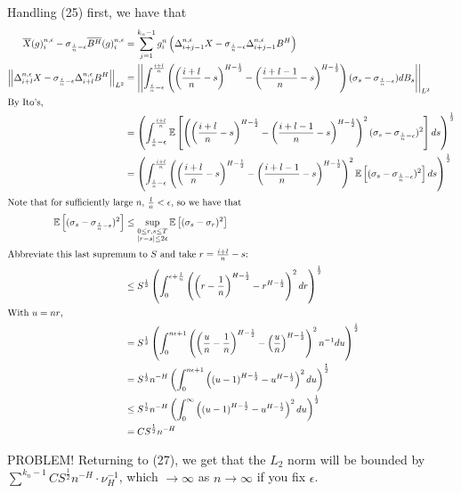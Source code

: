 \documentclass[12pt,letterpaper]{article}
\theoremstyle{definition}
\newcommand{\E}{\mathbb{E}}
\newcommand{\lpnorm}[2]{\left|\left|{#1}\right|\right|_{L^{#2}}}
\begin{document}
Handling (25) first, we have that
\begin{align}
  \overline{X}(g)^{n,\epsilon}_i - \sigma_{\frac{i}{n}-\epsilon}\overline{B^H}(g)^{n,\epsilon}_i &= \sum_{j=1}^{k_n-1}g^n_i\left( \Delta_{i+j-1}^{n,\epsilon}X - \sigma_{\frac{i}{n}-\epsilon}\Delta_{i+j-1}^{n,\epsilon}B^H\right) \\
    \lpnorm{\Delta_{i+l}^{n,\epsilon}X - \sigma_{\frac{i}{n}-\epsilon}\Delta_{i+l}^{n,\epsilon}B^H}{2} &= \lpnorm{\int_{\frac{i}{n} - \epsilon}^{\frac{i+l}{n}}\left( \left( \frac{i+l}{n} - s \right)^{H-\frac{1}{2}} - \left( \frac{i+l-1}{n} - s \right)^{H-\frac{1}{2}}\right) (\sigma_s - \sigma_{\frac{i}{n} - \epsilon})dB_s}{2} \\
    \intertext{By Ito's,}
                                                                              &= \left(\int_{\frac{i}{n} - \epsilon}^{\frac{i+l}{n}}\E\left[\left( \left( \frac{i+l}{n} - s \right)^{H-\frac{1}{2}} - \left( \frac{i+l-1}{n} - s \right)^{H-\frac{1}{2}}\right)^2 (\sigma_s - \sigma_{\frac{i}{n} - \epsilon})^2\right]ds\right)^{\frac{1}{2}} \\
                                                                              &= \left(\int_{\frac{i}{n} - \epsilon}^{\frac{i+l}{n}}\left( \left( \frac{i+l}{n} - s \right)^{H-\frac{1}{2}} - \left( \frac{i+l-1}{n} - s \right)^{H-\frac{1}{2}}\right)^2 \E\left[(\sigma_s - \sigma_{\frac{i}{n} - \epsilon})^2\right]ds\right)^{\frac{1}{2}} \\
                                                                              \intertext{Note that for sufficiently large \(n\), \(\frac{l}{n} < \epsilon\), so we have that}
    \E\left[(\sigma_s - \sigma_{\frac{i}{n} - \epsilon})^2\right] &\leq \sup_{\substack{0 \leq r,s \leq T \\ |r-s| \leq 2\epsilon}}\E\left[(\sigma_s - \sigma_r)^2\right] \\
    \intertext{Abbreviate this last supremum to \(S\) and take \(r = \frac{i+l}{n}-s\):}
                                                                  &\leq S^{\frac{1}{2}}\left(\int^{\epsilon+\frac{l}{n}}_0\left(\left(r - \frac{1}{n}\right)^{H-\frac{1}{2}} -  r^{H-\frac{1}{2}}\right)^2 dr\right)^{\frac{1}{2}} \\
                                                                  \intertext{With \(u = nr\),}
                                                                  &= S^{\frac{1}{2}}\left(\int^{n\epsilon+1}_0\left(\left(\frac{u}{n} - \frac{1}{n}\right)^{H-\frac{1}{2}} -  \left( \frac{u}{n} \right)^{H-\frac{1}{2}}\right)^2 n^{-1}du\right)^{\frac{1}{2}} \\
                                                                  &= S^{\frac{1}{2}}n^{-H}\left(\int^{n\epsilon+1}_0\left(\left(u - 1\right)^{H-\frac{1}{2}} -  u^{H-\frac{1}{2}}\right)^2 du\right)^{\frac{1}{2}} \\
                                                                  &\leq S^{\frac{1}{2}}n^{-H}\left(\int^{\infty}_0\left(\left(u - 1\right)^{H-\frac{1}{2}} -  u^{H-\frac{1}{2}}\right)^2 du\right)^{\frac{1}{2}} \\
                                                                  &= CS^{\frac{1}{2}}n^{-H}
\end{align}

PROBLEM! Returning to (27), we get that the \(L_2\) norm will be bounded by \(\sum^{k_n - 1} CS^{\frac{1}{2}}n^{-H} \cdot \nu_H^{-1}\), which \(\rightarrow \infty\) as \(n \rightarrow \infty\) if you fix \(\epsilon\).
\end{document}
